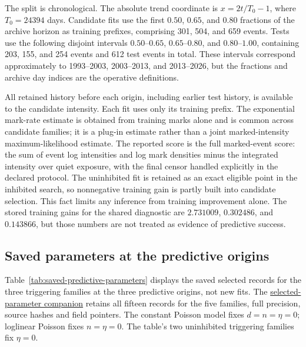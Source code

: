 The split is chronological. The absolute trend coordinate is \(x=2t/T_0-1\), where \(T_0=24394\) days. Candidate fits use the first \(0.50\), \(0.65\), and \(0.80\) fractions of the archive horizon as training prefixes, comprising 301, 504, and 659 events. Tests use the following disjoint intervals \(0.50\)--\(0.65\), \(0.65\)--\(0.80\), and \(0.80\)--\(1.00\), containing 203, 155, and 254 events and 612 test events in total. These intervals correspond approximately to 1993--2003, 2003--2013, and 2013--2026, but the fractions and archive day indices are the operative definitions.

All retained history before each origin, including earlier test history, is available to the candidate intensity. Each fit uses only its training prefix. The exponential mark-rate estimate is obtained from training marks alone and is common across candidate families; it is a plug-in estimate rather than a joint marked-intensity maximum-likelihood estimate. The reported score is the full marked-event score: the sum of event log intensities and log mark densities minus the integrated intensity over quiet exposure, with the final censor handled explicitly in the declared protocol. The uninhibited fit is retained as an exact eligible point in the inhibited search, so nonnegative training gain is partly built into candidate selection. This fact limits any inference from training improvement alone. The stored training gains for the shared diagnostic are \(2.731009\), \(0.302486\), and \(0.143866\), but those numbers are not treated as evidence of predictive success.

\subsection{Saved parameters at the predictive origins}\label{sec:saved-fits}
Table~\ref{tab:saved-predictive-parameters} displays the saved selected records for the three triggering families at the three predictive origins, not new fits. The \href{https://github.com/Drefetr/An_Evaluation_of_Earthquake_Models/blob/61aa599cd023f2441a6a0c6af9aa4b6fe9eda3e5/paper/supplements/predictive_parameters.json}{selected-parameter companion}
 retains all fifteen records for the five families, full precision, source hashes and field pointers. The constant Poisson model fixes \(d=n=\eta=0\); loglinear Poisson fixes \(n=\eta=0\). The table's two uninhibited triggering families fix \(\eta=0\).

